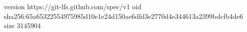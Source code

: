 version https://git-lfs.github.com/spec/v1
oid sha256:65a65322554975985d10e1e24d150ae6dfd3e2770d4e344613a2399bdcfb4de6
size 3145904
